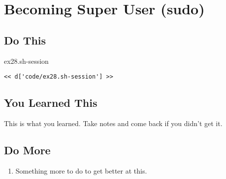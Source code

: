 \chapter{Becoming Super User (sudo)}

\section{Do This}

\begin{code}{ex28.sh-session}
\begin{Verbatim}
<< d['code/ex28.sh-session'] >>
\end{Verbatim}
\end{code}


\section{You Learned This}

This is what you learned.  Take notes and come back if you didn't get it.

\section{Do More}

\begin{enumerate}
\item Something more to do to get better at this.
\end{enumerate}

